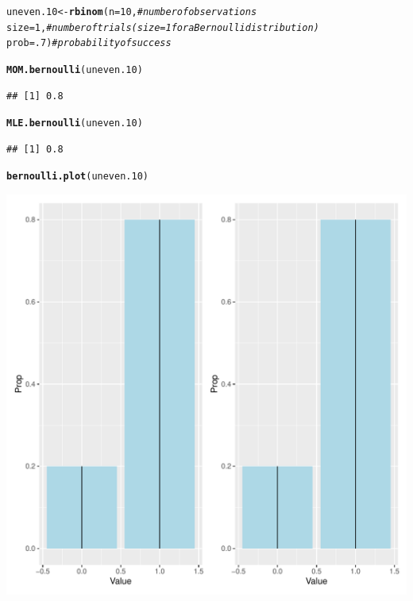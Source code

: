 \documentclass{article}\usepackage[]{graphicx}\usepackage[]{color}
\makeatletter
\def\maxwidth{ %
  \ifdim\Gin@nat@width>\linewidth
    \linewidth
  \else
    \Gin@nat@width
  \fi
}
\newcommand{\hlnum}[1]{\textcolor[rgb]{0.686,0.059,0.569}{#1}}%
\newcommand{\hlcom}[1]{\textcolor[rgb]{0.678,0.584,0.686}{\textit{#1}}}%
\newcommand{\hlstd}[1]{\textcolor[rgb]{0.345,0.345,0.345}{#1}}%
\newcommand{\hlkwb}[1]{\textcolor[rgb]{0.69,0.353,0.396}{#1}}%
\newcommand{\hlkwc}[1]{\textcolor[rgb]{0.333,0.667,0.333}{#1}}%
\newcommand{\hlkwd}[1]{\textcolor[rgb]{0.737,0.353,0.396}{\textbf{#1}}}%
\newenvironment{kframe}{%
 \def\at@end@of@kframe{}%
 \ifinner\ifhmode%
  \def\at@end@of@kframe{\end{minipage}}%
  \begin{minipage}{\columnwidth}%
 \fi\fi%
 \def\FrameCommand##1{\hskip\@totalleftmargin \hskip-\fboxsep
 \colorbox{shadecolor}{##1}\hskip-\fboxsep
     \hskip-\linewidth \hskip-\@totalleftmargin \hskip\columnwidth}%
 \MakeFramed {\advance\hsize-\width
   \@totalleftmargin\z@ \linewidth\hsize
   \@setminipage}}%
 {\par\unskip\endMakeFramed%
 \at@end@of@kframe}
\newenvironment{knitrout}{}{} %
\makeatother
\begin{document}
\begin{enumerate}
\begin{enumerate}
\begin{knitrout}
\color{fgcolor}\begin{kframe}
\begin{alltt}
\hlstd{uneven.10} \hlkwb{<-} \hlkwd{rbinom}\hlstd{(}\hlkwc{n}\hlstd{=}\hlnum{10}\hlstd{,}        \hlcom{#number of observations}
                    \hlkwc{size}\hlstd{=}\hlnum{1}\hlstd{,}        \hlcom{#number of trials (size=1 for a Bernoulli distribution)}
                    \hlkwc{prob}\hlstd{=}\hlnum{.7}\hlstd{)}       \hlcom{#probability of success}

\hlkwd{MOM.bernoulli}\hlstd{(uneven.10)}
\end{alltt}
\begin{verbatim}
## [1] 0.8
\end{verbatim}
\begin{alltt}
\hlkwd{MLE.bernoulli}\hlstd{(uneven.10)}
\end{alltt}
\begin{verbatim}
## [1] 0.8
\end{verbatim}
\begin{alltt}
\hlkwd{bernoulli.plot}\hlstd{(uneven.10)}
\end{alltt}
\end{kframe}
\includegraphics[width=\maxwidth]{figure/unnamed-chunk-4-1} 
\end{knitrout}

\end{enumerate}
\end{enumerate}
\end{document}
